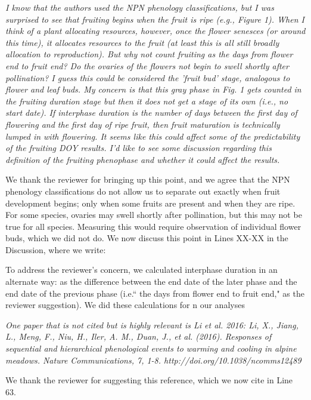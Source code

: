 \documentclass[10.95pt,a4paper]{letter}
\begin{document}
\par \emph{I know that the authors used the NPN phenology classifications, but I was surprised to see that fruiting begins when the fruit is ripe (e.g., Figure 1). When I think of a plant allocating resources, however, once the flower senesces (or around this time), it allocates resources to the fruit (at least this is all still broadly allocation to reproduction).  But why not count fruiting as the days from flower end to fruit end? Do the ovaries of the flowers not begin to swell shortly after pollination? I guess this could be considered the 'fruit bud' stage, analogous to flower and leaf buds.  My concern is that this gray phase in Fig. 1 gets counted in the fruiting duration stage but then it does not get a stage of its own (i.e., no start date). If interphase duration is the number of days between the first day of flowering and the first day of ripe fruit, then fruit maturation is technically lumped in with flowering. It seems like this could affect some of the predictability of the fruiting DOY results. I'd like to see some discussion regarding this definition of the fruiting phenophase and whether it could affect the results.}  
\par We thank the reviewer for bringing up this point, and we agree that the NPN phenology classifications do not allow us to separate out exactly when fruit development begins; only when some fruits are present and when they are ripe. For some species, ovaries may swell shortly after pollination, but this may not be true for all species. Measuring this would require observation of individual flower buds, which we did not do. We now discuss this point in Lines XX-XX in the Discussion, where we write:

\par To address the reviewer's concern, we calculated interphase duration in an alternate way: as the difference between the end date of the later phase and the end date of the previous phase (i.e.`` the days from flower end to fruit end," as the reviewer suggestion). We did these calculations for n our analyses 


\par \emph{One paper that is not cited but is highly relevant is Li et al. 2016: Li, X., Jiang, L., Meng, F., Niu, H., Iler, A. M., Duan, J., et al. (2016). Responses of sequential and hierarchical phenological events to warming and cooling in alpine meadows. Nature Communications, 7, 1-8. http://doi.org/10.1038/ncomms12489}

\par We thank the reviewer for suggesting this reference, which we now cite in Line 63.
\end{document}
